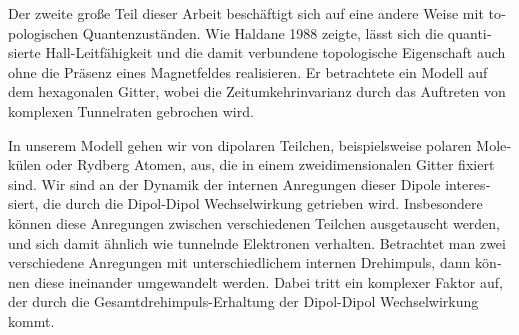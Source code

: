\begin{otherlanguage}{ngerman}
Der zweite große Teil dieser Arbeit beschäftigt sich auf eine andere Weise mit topologischen Quantenzuständen.
Wie Haldane 1988 zeigte, lässt sich die quantisierte Hall-Leitfähigkeit und die damit verbundene topologische Eigenschaft auch ohne die Präsenz eines Magnetfeldes realisieren.
Er betrachtete ein Modell auf dem hexagonalen Gitter, wobei die Zeitumkehrinvarianz durch das Auftreten von komplexen Tunnelraten gebrochen wird.

In unserem Modell gehen wir von dipolaren Teilchen, beispielsweise polaren Molekülen oder Rydberg Atomen, aus, die in einem zweidimensionalen Gitter fixiert sind.
Wir sind an der Dynamik der internen Anregungen dieser Dipole interessiert, die durch die Dipol-Dipol Wechselwirkung getrieben wird.
Insbesondere können diese Anregungen zwischen verschiedenen Teilchen ausgetauscht werden, und sich damit ähnlich wie tunnelnde Elektronen verhalten.
Betrachtet man zwei verschiedene Anregungen mit unterschiedlichem internen Drehimpuls, dann können diese ineinander umgewandelt werden.
Dabei tritt ein komplexer Faktor auf, der durch die Gesamtdrehimpuls-Erhaltung der Dipol-Dipol Wechselwirkung kommt.



\end{otherlanguage}
